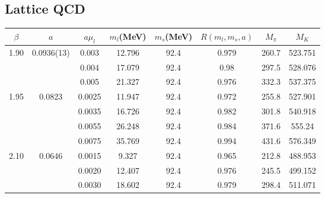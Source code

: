 \documentclass[10pt,a4paper]{article}
\begin{document}
\subsection{Lattice QCD}
			
			\begin{table}[h!]
				\begin{tabular}{cccccccc}
					$\beta$ & $a$ & $a \mu_l$ & $m_l$(MeV) & $m_s$(MeV) & $R(m_l,m_s,a)$ & $M_{\pi}$ & $M_K$ \\ 
					\hline 1.90 & 0.0936(13) & 0.003 & 12.796 & 92.4 & 0.979 & 260.7 & 523.751 \\ 
					&  & 0.004 & 17.079 & 92.4 & 0.98 & 297.5 & 528.076 \\ 
					&  & 0.005 & 21.327 & 92.4 & 0.976 & 332.3 & 537.375 \\ 
					\hline 1.95 & 0.0823 & 0.0025 & 11.947 & 92.4 & 0.972 & 255.8 & 527.901 \\ 
					&  & 0.0035 & 16.726 & 92.4 & 0.982 & 301.8 & 540.918 \\ 
					&  & 0.0055 & 26.248 & 92.4 & 0.984 & 371.6 & 555.24 \\ 
					&  & 0.0075 & 35.769 & 92.4 & 0.994 & 431.6 & 576.349 \\ 
					\hline 2.10 & 0.0646 & 0.0015 & 9.327 & 92.4 & 0.965 & 212.8 & 488.953 \\ 
					&  & 0.0020 & 12.407 & 92.4 & 0.976 & 245.5 & 499.152 \\ 
					&  & 0.0030 & 18.602 & 92.4 & 0.979 & 298.4 & 511.071 \\
					\hline
				\end{tabular} 
			\end{table}
			
\end{document}
